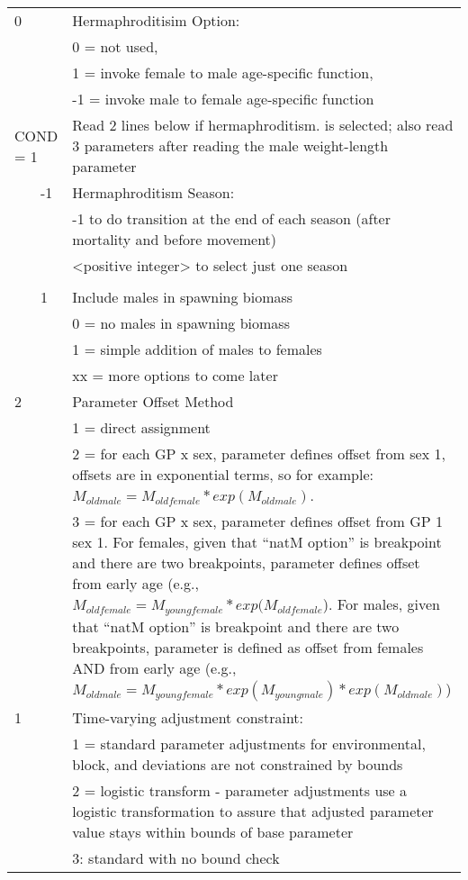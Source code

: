 \begin{center}
\begin{longtable}{p{0.5cm} p{2cm} p{12cm}}
	  0 & & Hermaphroditisim Option:\\
	   &  & 0 = not used, \\
	   &  & 1 = invoke female to male age-specific function, \\
	   &  & -1 = invoke male to female age-specific function \\
	  \hline

	  \multicolumn{2}{l}{COND = 1}& Read 2 lines below if hermaphroditism. is selected; also read 3 parameters after reading the male weight-length parameter\\
	  & -1 & Hermaphroditism Season: \\
	  &    & -1 to do transition at the end of each season (after mortality and before movement)\\
	  &    & <positive integer> to select just one season\\
	  \\
	  & 1  & Include males in spawning biomass \\
	  &    & 0 = no males in spawning biomass \\
	  &    & 1 = simple addition of males to females\\
	  &    & xx = more options to come later \\
	  \hline

	  2 & & Parameter Offset Method \\
	    & & 1 = direct assignment \\
	    & & 2 = for each GP x sex, parameter defines offset from sex 1, offsets are in exponential terms, so for example: $M_{oldmale} = M_{oldfemale}*exp(M_{oldmale})$. \\
	    & & 3 = for each GP x sex, parameter defines offset from GP 1 sex 1.  For females, given that “natM option” is breakpoint and there are two breakpoints, parameter defines offset from early age (e.g., $M_{oldfemale} = M_{youngfemale}*exp(M_{oldfemale}$). For males, given that “natM option” is breakpoint and there are two breakpoints, parameter is defined as offset from females AND from early age (e.g., $M_{oldmale} = M_{youngfemale}*exp(M_{youngmale})*exp(M_{oldmale})$)\\
	 \hline

	 1 & & Time-varying adjustment constraint:\\
	   & & 1 = standard parameter adjustments for environmental, block, and deviations are not constrained by bounds \\
	   & & 2 = logistic transform - parameter adjustments use a logistic transformation to assure that adjusted parameter value stays within bounds of base parameter \\
	   & & 3: standard with no bound check \\
	 \hline

	\end{longtable}
\end{center}


